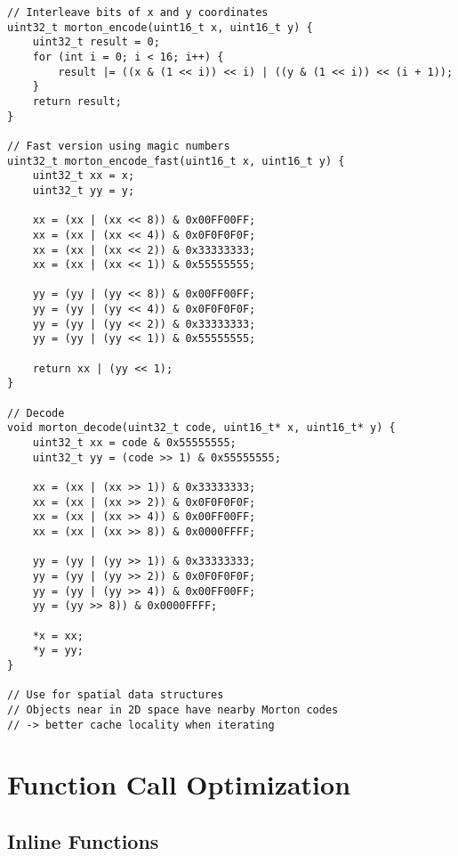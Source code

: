 \begin{lstlisting}
// Interleave bits of x and y coordinates
uint32_t morton_encode(uint16_t x, uint16_t y) {
    uint32_t result = 0;
    for (int i = 0; i < 16; i++) {
        result |= ((x & (1 << i)) << i) | ((y & (1 << i)) << (i + 1));
    }
    return result;
}

// Fast version using magic numbers
uint32_t morton_encode_fast(uint16_t x, uint16_t y) {
    uint32_t xx = x;
    uint32_t yy = y;

    xx = (xx | (xx << 8)) & 0x00FF00FF;
    xx = (xx | (xx << 4)) & 0x0F0F0F0F;
    xx = (xx | (xx << 2)) & 0x33333333;
    xx = (xx | (xx << 1)) & 0x55555555;

    yy = (yy | (yy << 8)) & 0x00FF00FF;
    yy = (yy | (yy << 4)) & 0x0F0F0F0F;
    yy = (yy | (yy << 2)) & 0x33333333;
    yy = (yy | (yy << 1)) & 0x55555555;

    return xx | (yy << 1);
}

// Decode
void morton_decode(uint32_t code, uint16_t* x, uint16_t* y) {
    uint32_t xx = code & 0x55555555;
    uint32_t yy = (code >> 1) & 0x55555555;

    xx = (xx | (xx >> 1)) & 0x33333333;
    xx = (xx | (xx >> 2)) & 0x0F0F0F0F;
    xx = (xx | (xx >> 4)) & 0x00FF00FF;
    xx = (xx | (xx >> 8)) & 0x0000FFFF;

    yy = (yy | (yy >> 1)) & 0x33333333;
    yy = (yy | (yy >> 2)) & 0x0F0F0F0F;
    yy = (yy | (yy >> 4)) & 0x00FF00FF;
    yy = (yy >> 8)) & 0x0000FFFF;

    *x = xx;
    *y = yy;
}

// Use for spatial data structures
// Objects near in 2D space have nearby Morton codes
// -> better cache locality when iterating
\end{lstlisting}

\section{Function Call Optimization}

\subsection{Inline Functions}

